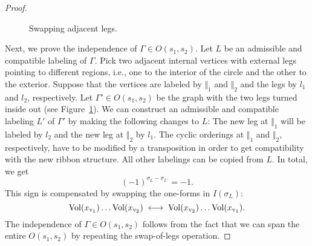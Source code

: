 \documentclass[\MainFolder/Text.tex]{subfiles}
\begin{document}
\begin{proof}
\begin{figure}[t]
\centering

\caption[Swap of adjacent vertices on a circular graph.]{Swapping adjacent legs.}\label{Fig:TwoLegs}
\end{figure}

Next, we prove the independence of $\Gamma\in O(s_1,s_2)$. Let $L$ be an admissible and compatible labeling of $\Gamma$. Pick two adjacent internal vertices with external legs pointing to different regions, i.e., one to the interior of the circle and the other to the exterior. Suppose that the vertices are labeled by $\Vert_1$ and $\Vert_2$ and the legs by $l_1$ and $l_2$, respectively. Let $\Gamma'\in O(s_1,s_2)$ be the graph with the two legs turned inside out (see Figure~\ref{Fig:TwoLegs}). We can construct an admissible and compatible labeling $L'$ of $\Gamma'$ by making the following changes to $L$: The new leg at $\Vert_1$ will be labeled by $l_2$ and the new leg at $\Vert_2$ by $l_1$.
The cyclic orderings at $\Vert_1$ and $\Vert_2$, respectively, have to be modified by a transposition in order to get compatibility with the new ribbon structure. All other labelings can be copied from $L$.
In total, we get
$$ (-1)^{\sigma_L - \sigma_{L'}} = -1. $$
This sign is compensated by swapping the one-forms in $I(\sigma_L)$:
$$ \mathrm{Vol} (x_{\mathrm{v}_1}) \dots \mathrm{Vol}(x_{\mathrm{v}_2}) \;\longleftrightarrow\;\mathrm{Vol}(x_{\mathrm{v}_2}) \dots \mathrm{Vol}(x_{\mathrm{v}_1}). $$
The independence of $\Gamma\in O(s_1,s_2)$ follows from the fact that we can span the entire $O(s_1,s_2)$ by repeating the swap-of-legs operation.
\end{proof}
\end{document}
